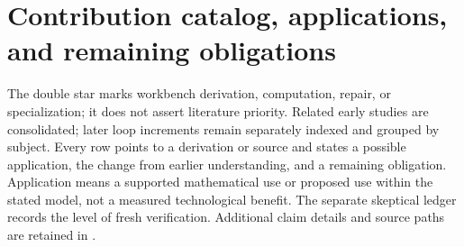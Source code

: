 \section{Contribution catalog, applications, and remaining obligations}
\label{app:contributions}
The double star marks workbench derivation, computation, repair, or specialization; it does not assert literature priority. Related early studies are consolidated; later loop increments remain separately indexed and grouped by subject. Every row points to a derivation or source and states a possible application, the change from earlier understanding, and a remaining obligation. Application means a supported mathematical use or proposed use within the stated model, not a measured technological benefit. The separate skeptical ledger records the level of fresh verification. Additional claim details and source paths are retained in .
\begingroup\footnotesize\setlength{\tabcolsep}{4pt}\renewcommand{\arraystretch}{1.14}
